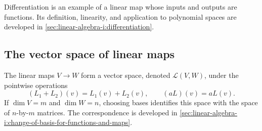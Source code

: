 Differentiation is an example of a linear map whose inputs and outputs
are functions. Its definition, linearity, and application to polynomial
spaces are developed in
\autoref{sec:linear-algebra-i:differentiation}.

\subsection{The vector space of linear maps}

The linear maps \(V\to W\) form a vector space, denoted
\(\mathcal L(V,W)\), under the pointwise operations
\[
  (L_1+L_2)(v)=L_1(v)+L_2(v),\qquad (aL)(v)=aL(v).
\]
If \(\dim V=m\) and \(\dim W=n\), choosing bases identifies this space
with the space of \(n\)-by-\(m\) matrices. The correspondence is developed
in \autoref{sec:linear-algebra-i:change-of-basis-for-functions-and-maps}.


